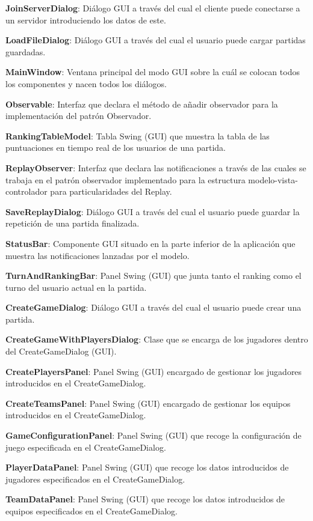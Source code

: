 \documentclass[../DocumentoOficial.tex]{subfiles}
\begin{document}
\textbf{JoinServerDialog}: Diálogo GUI a través del cual el cliente puede conectarse a un servidor introduciendo los datos de este.

\textbf{LoadFileDialog}: Diálogo GUI a través del cual el usuario puede cargar partidas guardadas.

\textbf{MainWindow}: Ventana principal del modo GUI sobre la cuál se colocan todos los componentes y nacen todos los diálogos.

\textbf{Observable}: Interfaz que declara el método de añadir observador para la implementación del patrón Observador.

\textbf{RankingTableModel}: Tabla Swing (GUI) que muestra la tabla de las puntuaciones en tiempo real de los usuarios de una partida.

\textbf{ReplayObserver}: Interfaz que declara las notificaciones a través de las cuales se trabaja en el patrón observador implementado para la estructura modelo-vista-controlador para particularidades del Replay.

\textbf{SaveReplayDialog}: Diálogo GUI a través del cual el usuario puede guardar la repetición de una partida finalizada.

\textbf{StatusBar}: Componente GUI situado en la parte inferior de la aplicación que muestra las notificaciones lanzadas por el modelo.

\textbf{TurnAndRankingBar}: Panel Swing (GUI) que junta tanto el ranking como el turno del usuario actual en la partida.

\textbf{CreateGameDialog}: Diálogo GUI a través del cual el usuario puede crear una partida.

\textbf{CreateGameWithPlayersDialog}: Clase que se encarga de los jugadores dentro del CreateGameDialog (GUI).

\textbf{CreatePlayersPanel}: Panel Swing (GUI) encargado de gestionar los jugadores introducidos en el CreateGameDialog.

\textbf{CreateTeamsPanel}: Panel Swing (GUI) encargado de gestionar los equipos introducidos en el CreateGameDialog.

\textbf{GameConfigurationPanel}: Panel Swing (GUI) que recoge la configuración de juego especificada en el CreateGameDialog.

\textbf{PlayerDataPanel}: Panel Swing (GUI) que recoge los datos introducidos de jugadores especificados en el CreateGameDialog.

\textbf{TeamDataPanel}: Panel Swing (GUI) que recoge los datos introducidos de equipos especificados en el CreateGameDialog.
\end{document}
